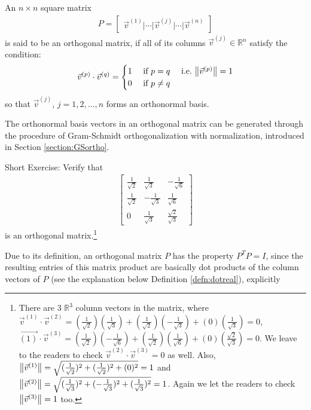 \begin{defn}
\label{defn:orthomatrix}
An $n \times n$ square matrix
\begin{align*}
P = \begin{bmatrix}
\vec{v}^{(1)}|\cdots|\vec{v}^{(j)}|\cdots|\vec{v}^{(n)}   
\end{bmatrix}
\end{align*}
is said to be an orthogonal matrix, if all of its columns $\vec{v}^{(j)} \in \mathbb{R}^n$ satisfy the condition:
\begin{align*}
\vec{v}^{(p)} \cdot \vec{v}^{(q)} =
\begin{cases}
1 &\text{ if } p = q \quad \text{ i.e.\ } \norm{\vec{v}^{(p)}} = 1 \\
0 &\text{ if } p \neq q    
\end{cases}
\end{align*}
so that $\vec{v}^{(j)}$, $j=1,2,\ldots,n$ forms an orthonormal basis.
\end{defn}
The orthonormal basis vectors in an orthogonal matrix can be generated through the procedure of Gram-Schmidt orthogonalization with normalization, introduced in Section \ref{section:GSortho}.\par
Short Exercise: Verify that 
\begin{align*}
\begin{bmatrix}
\frac{1}{\sqrt{2}} & \frac{1}{\sqrt{3}} & -\frac{1}{\sqrt{6}} \\
\frac{1}{\sqrt{2}} & -\frac{1}{\sqrt{3}} & \frac{1}{\sqrt{6}} \\
0 & \frac{1}{\sqrt{3}} & \frac{\sqrt{2}}{\sqrt{3}}
\end{bmatrix}
\end{align*}
is an orthogonal matrix.\footnote{There are $3$ $\mathbb{R}^3$ column vectors in the matrix, where $\vec{v}^{(1)} \cdot \vec{v}^{(2)} = (\frac{1}{\sqrt{2}})(\frac{1}{\sqrt{3}}) + (\frac{1}{\sqrt{2}})(-\frac{1}{\sqrt{3}}) + (0)(\frac{1}{\sqrt{3}}) = 0$, $\vec{(1)} \cdot \vec{v}^{(3)} = (\frac{1}{\sqrt{2}})(-\frac{1}{\sqrt{6}}) + (\frac{1}{\sqrt{2}})(\frac{1}{\sqrt{6}}) + (0)(\frac{\sqrt{2}}{\sqrt{3}}) = 0$. We leave to the readers to check $\vec{v}^{(2)} \cdot \vec{v}^{(3)} = 0$ as well. Also, $\norm{\vec{v}^{(1)}} = \sqrt{(\frac{1}{\sqrt{2}})^2 + (\frac{1}{\sqrt{2}})^2 + (0)^2} = 1$ and $\norm{\vec{v}^{(2)}} = \sqrt{(\frac{1}{\sqrt{3}})^2 + (-\frac{1}{\sqrt{3}})^2 + (\frac{1}{\sqrt{3}})^2} = 1$. Again we let the readers to check $\norm{\vec{v}^{(3)}} = 1$ too.}\par
Due to its definition, an orthogonal matrix $P$ has the property $P^TP = I$, since the resulting entries of this matrix product are basically dot products of the column vectors of $P$ (see the explanation below Definition \ref{defn:dotreal}), explicitly
